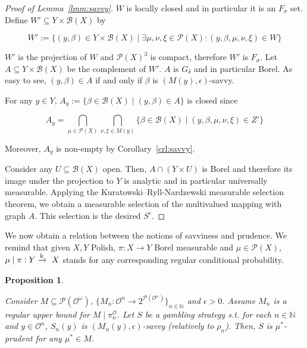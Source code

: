 \documentclass[aop,preprint]{imsart}
\numberwithin{equation}{section}
\theoremstyle{definition}
\theoremstyle{plain}
\newtheorem{proposition}{Proposition}[section]
\newcommand{\Nats}{\mathbb{N}}
\newcommand{\Sq}[2]{\{#1\}_{#2 \in \Nats}}
\newcommand{\Sqn}[1]{\Sq{#1}{n}}
\newcommand{\M}{\xrightarrow{\textnormal{k}}}
\newcommand{\PM}{\mathcal{P}}
\newcommand{\Ob}{\mathcal{O}}
\newcommand{\OO}{\Ob^\omega}
\newcommand{\PO}{\pi^\Ob}
\newcommand{\PMO}{\PM(\OO)}
\newcommand{\Gm}{\mathcal{B}}
\begin{document}
\begin{proof}[Proof of Lemma~\ref{lmm:savvy}]
$W$ is locally closed and in particular it is an $F_\sigma$ set. Define $W' \subseteq Y \times \Gm\left(X\right)$ by

$$W':=\{\left(y,\beta\right) \in Y \times \Gm\left(X\right) \mid \exists \mu,\nu,\xi \in \PM\left(X\right): \left(y,\beta,\mu,\nu,\xi\right) \in W\}$$

$W'$ is the projection of $W$ and $\PM\left(X\right)^3$ is compact, therefore $W'$ is $F_\sigma$. Let $A \subseteq Y \times \Gm\left(X\right)$ be the complement of $W'$. $A$ is $G_\delta$ and in particular Borel. As easy to see, $\left(y,\beta\right) \in A$ if and only if $\beta$ is $\left(M\left(y\right),\epsilon\right)$-savvy.

For any $y \in Y$, $A_y:=\{\beta \in \Gm\left(X\right) \mid \left(y,\beta\right) \in A\}$ is closed since

$$A_y = \bigcap_{\mu \in \PM\left(X\right)} \bigcap_{\nu,\xi \in M\left(y\right)} \{\beta \in \Gm\left(X\right) \mid \left(y,\beta,\mu,\nu,\xi\right) \in Z'\}$$

Moreover, $A_y$ is non-empty by Corollary~\ref{crl:savvy}.

Consider any $U \subseteq \Gm\left(X\right)$ open. Then, $A \cap \left(Y \times U\right)$ is Borel and therefore its image under the projection to $Y$ is analytic and in particular universally measurable. Applying the Kuratowski--Ryll-Nardzewski measurable selection theorem, we obtain a measurable selection of the multivalued mapping with graph $A$. This selection is the desired $S^\epsilon$.
\end{proof}

We now obtain a relation between the notions of savviness and prudence. We remind that given $X,Y$ Polish, $\pi: X \rightarrow Y$ Borel measurable and $\mu \in \PM\left(X\right)$, $\mu \mid \pi: Y \M\ X$ stands for any corresponding regular conditional probability.

\begin{samepage}
\begin{proposition}
\label{crl:savvy_is_prudent}

Consider $M \subseteq \PMO$, $\Sqn{M_n: \Ob^n \rightarrow 2^{\PMO}}$ and $\epsilon > 0$. Assume $M_n$ is a regular upper bound for $M \mid \PO_n$. Let $S$ be a gambling strategy s.t. for each $n \in \Nats$ and $y \in \Ob^n$, $S_n\left(y\right)$ is $\left(M_n(y),\epsilon\right)$-savvy (relatively to $\rho_n$). Then, $S$ is $\mu^*$-prudent for any $\mu^* \in M$.

\end{proposition}
\end{samepage}
\end{document}
